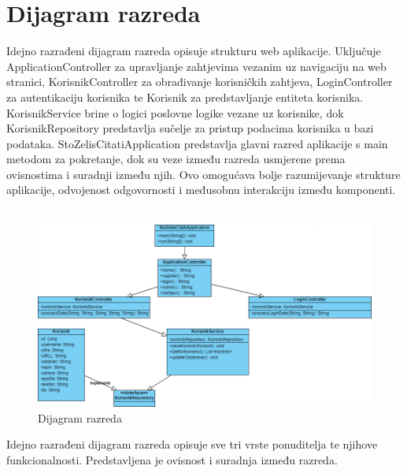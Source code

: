 			
			\eject
			
			
		\section{Dijagram razreda} 
			
			Idejno razrađeni dijagram razreda opisuje strukturu web aplikacije. Uključuje ApplicationController za upravljanje zahtjevima vezanim uz navigaciju na web stranici, KorisnikController za obrađivanje korisničkih zahtjeva, LoginController za autentikaciju korisnika te Korisnik za predstavljanje entiteta korisnika. KorisnikService brine o logici poslovne logike vezane uz korisnike, dok KorisnikRepository predstavlja sučelje za pristup podacima korisnika u bazi podataka. StoZelisCitatiApplication predstavlja glavni razred aplikacije s main metodom za pokretanje, dok su veze između razreda usmjerene prema ovisnostima i suradnji između njih. Ovo omogućava bolje razumijevanje strukture aplikacije, odvojenost odgovornosti i međusobnu interakciju između komponenti. \\ \\
			
			\begin{figure}[H]
				\includegraphics[width=\textwidth]{dijagrami/ClassDiagram1.PNG} %
				\centering
				\caption{Dijagram razreda}
				\label{fig:razred}
			\end{figure}
			
			\eject
			
			
			Idejno razrađeni dijagram razreda opisuje sve tri vrste ponuditelja te njihove funkcionalnosti. Predstavljena je ovisnost i suradnja između razreda.
			\\ \\
			
